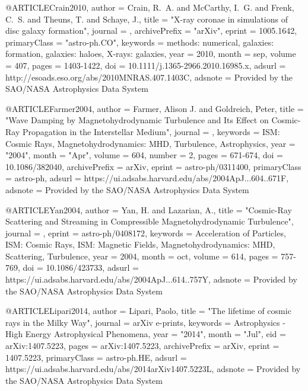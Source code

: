 \documentclass[useAMS,usenatbib]{mnras}
\begin{document}
@ARTICLE{Crain2010,
   author = {{Crain}, R.~A. and {McCarthy}, I.~G. and {Frenk}, C.~S. and 
	{Theuns}, T. and {Schaye}, J.},
    title = "{X-ray coronae in simulations of disc galaxy formation}",
  journal = {\mnras},
archivePrefix = "arXiv",
   eprint = {1005.1642},
 primaryClass = "astro-ph.CO",
 keywords = {methods: numerical, galaxies: formation, galaxies: haloes, X-rays: galaxies},
     year = 2010,
    month = sep,
   volume = 407,
    pages = {1403-1422},
      doi = {10.1111/j.1365-2966.2010.16985.x},
   adsurl = {http://esoads.eso.org/abs/2010MNRAS.407.1403C},
  adsnote = {Provided by the SAO/NASA Astrophysics Data System}
}

@ARTICLE{Farmer2004,
       author = {{Farmer}, Alison J. and {Goldreich}, Peter},
        title = "{Wave Damping by Magnetohydrodynamic Turbulence and Its Effect on Cosmic-Ray Propagation in the Interstellar Medium}",
      journal = {\apj},
     keywords = {ISM: Cosmic Rays, Magnetohydrodynamics: MHD, Turbulence, Astrophysics},
         year = "2004",
        month = "Apr",
       volume = {604},
       number = {2},
        pages = {671-674},
          doi = {10.1086/382040},
archivePrefix = {arXiv},
       eprint = {astro-ph/0311400},
 primaryClass = {astro-ph},
       adsurl = {https://ui.adsabs.harvard.edu/abs/2004ApJ...604..671F},
      adsnote = {Provided by the SAO/NASA Astrophysics Data System}
}

@ARTICLE{Yan2004,
   author = {{Yan}, H. and {Lazarian}, A.},
    title = "{Cosmic-Ray Scattering and Streaming in Compressible Magnetohydrodynamic Turbulence}",
  journal = {\apj},
   eprint = {astro-ph/0408172},
 keywords = {Acceleration of Particles, ISM: Cosmic Rays, ISM: Magnetic Fields, Magnetohydrodynamics: MHD, Scattering, Turbulence},
     year = 2004,
    month = oct,
   volume = 614,
    pages = {757-769},
      doi = {10.1086/423733},
   adsurl = {https://ui.adsabs.harvard.edu/abs/2004ApJ...614..757Y},
  adsnote = {Provided by the SAO/NASA Astrophysics Data System}
}

@ARTICLE{Lipari2014,
       author = {{Lipari}, Paolo},
        title = "{The lifetime of cosmic rays in the Milky Way}",
      journal = {arXiv e-prints},
     keywords = {Astrophysics - High Energy Astrophysical Phenomena},
         year = "2014",
        month = "Jul",
          eid = {arXiv:1407.5223},
        pages = {arXiv:1407.5223},
archivePrefix = {arXiv},
       eprint = {1407.5223},
 primaryClass = {astro-ph.HE},
       adsurl = {https://ui.adsabs.harvard.edu/abs/2014arXiv1407.5223L},
      adsnote = {Provided by the SAO/NASA Astrophysics Data System}
}
\end{document}
